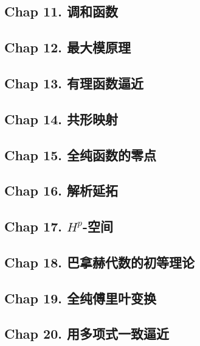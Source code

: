 \subsection{Chap 11. 调和函数}

\subsection{Chap 12. 最大模原理}

\subsection{Chap 13. 有理函数逼近}

\subsection{Chap 14. 共形映射}

\subsection{Chap 15. 全纯函数的零点}

\subsection{Chap 16. 解析延拓}

\subsection{Chap 17. $H^p$-空间}

\subsection{Chap 18. 巴拿赫代数的初等理论}

\subsection{Chap 19. 全纯傅里叶变换}

\subsection{Chap 20. 用多项式一致逼近}
